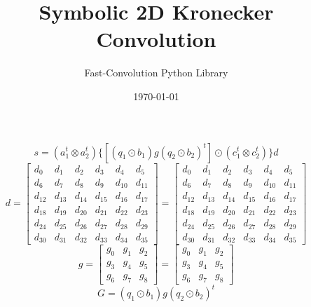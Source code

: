 \documentclass{article}%
\title{Symbolic 2D Kronecker Convolution}%
\author{Fast{-}Convolution Python Library}%
\date{\today}%
\begin{document}
%
\normalsize%
\maketitle%
\[%
s=(a_1^t \otimes a_2^t) \{[(q_1 \odot b_1) g (q_2 \odot b_2)^t] \odot (c_1^t \otimes c_2^t)\} d%
\]%
\[%
d = \left[\begin{matrix}d_{0} & d_{1} & d_{2} & d_{3} & d_{4} & d_{5}\\d_{6} & d_{7} & d_{8} & d_{9} & d_{10} & d_{11}\\d_{12} & d_{13} & d_{14} & d_{15} & d_{16} & d_{17}\\d_{18} & d_{19} & d_{20} & d_{21} & d_{22} & d_{23}\\d_{24} & d_{25} & d_{26} & d_{27} & d_{28} & d_{29}\\d_{30} & d_{31} & d_{32} & d_{33} & d_{34} & d_{35}\end{matrix}\right] = \left[\begin{matrix}d_{0} & d_{1} & d_{2} & d_{3} & d_{4} & d_{5}\\d_{6} & d_{7} & d_{8} & d_{9} & d_{10} & d_{11}\\d_{12} & d_{13} & d_{14} & d_{15} & d_{16} & d_{17}\\d_{18} & d_{19} & d_{20} & d_{21} & d_{22} & d_{23}\\d_{24} & d_{25} & d_{26} & d_{27} & d_{28} & d_{29}\\d_{30} & d_{31} & d_{32} & d_{33} & d_{34} & d_{35}\end{matrix}\right]%
\]%
\[%
g = \left[\begin{matrix}g_{0} & g_{1} & g_{2}\\g_{3} & g_{4} & g_{5}\\g_{6} & g_{7} & g_{8}\end{matrix}\right] = \left[\begin{matrix}g_{0} & g_{1} & g_{2}\\g_{3} & g_{4} & g_{5}\\g_{6} & g_{7} & g_{8}\end{matrix}\right]%
\]%
\[%
G = (q_1 \odot b_1) g (q_2 \odot b_2)^t%
\]%
\end{document}
